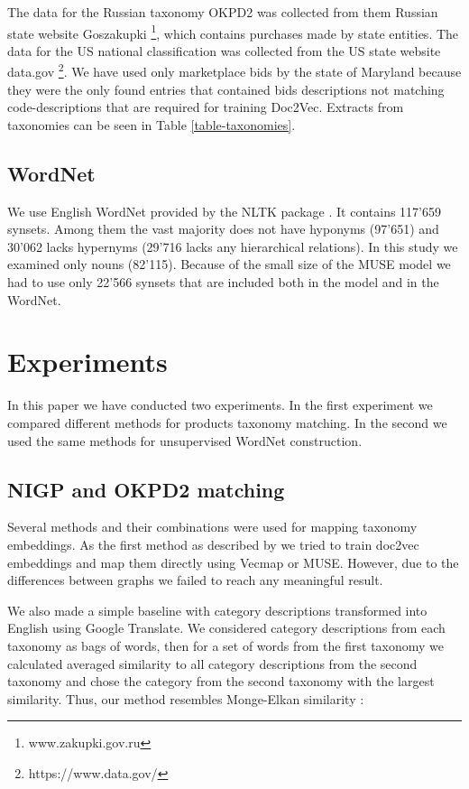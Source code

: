 \documentclass[11pt,a4paper]{article}
\begin{document}
The data for the Russian taxonomy OKPD2 was collected from them Russian state website Goszakupki \footnote{www.zakupki.gov.ru}, which contains purchases made by state entities.
The data for the US national classification was collected from the US state website data.gov \footnote{https://www.data.gov/}. We have used only marketplace bids by the state of Maryland because they were the only found entries that contained bids descriptions not matching code-descriptions that are required for training Doc2Vec. Extracts from taxonomies can be seen in Table \ref{table-taxonomies}.

\subsection{WordNet}
We use English WordNet provided by the NLTK package \cite{wordnet,nltk}. It contains 117'659 synsets. Among them the vast majority does not have hyponyms (97'651) and 30'062 lacks hypernyms (29'716 lacks any hierarchical relations). In this study we examined only nouns (82'115). Because of the small size of the MUSE model we had to use only 22'566 synsets that are included both in the model and in the WordNet.
\section{Experiments}
In this paper we have conducted two experiments. In the first experiment we compared different methods for products taxonomy matching. In the second we used the same methods for unsupervised WordNet construction.
\subsection{NIGP and OKPD2 matching}
Several methods and their combinations were used for mapping taxonomy embeddings. As the first method as described by \cite{gordeev-fruct}  we tried to train doc2vec embeddings and map them directly using Vecmap or MUSE. However, due to the differences between graphs we failed to reach any meaningful result.

We also made a simple baseline with category descriptions transformed into English using Google Translate. We considered category descriptions from each taxonomy as bags of words, then for a set of words from the first taxonomy we calculated averaged similarity to all category descriptions from the second taxonomy and chose the category from the second taxonomy with the largest similarity. Thus, our method resembles Monge-Elkan similarity \cite[p.~111]{dupe-detect}:
\end{document}
